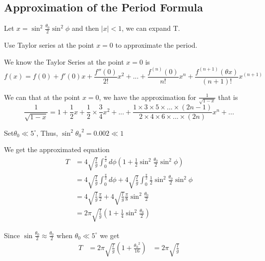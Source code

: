 \documentclass{article}
\begin{document}
\subsection{Approximation of the Period Formula}
\par Let $ x= \sin^2 \frac{\theta_0}{2} \sin^2 \phi $ and then $|x| < 1$, we can expand T.\\
\par  Use Taylor series at the point $x=0$ to approximate the period.\\
	\par We know the Taylor Series at the point $x=0$ is 
\begin{equation*}
 f(x) = f(0)+f'(0)x+\frac{f''(0)}{2!}x^2 +...+\frac{f^{(n)}(0)}{n!}x^n + \frac{f^{(n+1)}(\theta x)}{(n+1)!}x^ {(n+1)}
\end{equation*}
	\par We can that at the point $x=0$, we have the approximation for $ \frac{1}{\sqrt{1-x}} $ that is 
\begin{equation*}
 \frac{1}{\sqrt{1-x}} = 1+\frac{1}{2}x +\frac{1}{2} \times \frac{3}{4}x^2 +... + \frac{1\times 3 \times 5 \times ... \times (2n-1)}{2 \times 4 \times 6 \times ... \times (2n)} x^n +...
\end{equation*}
	\par  Set$  \theta_0 \ll 5^\circ $, Thus, $\sin^2 {\theta_0}^{2} = 0.002 \ll 1$ \\ 
	\par We get the approximated equation 
\begin{equation*}
 \begin{aligned}
 T & =  4\sqrt{\frac{l}{g}} \int_0^{\frac{\pi}{2}} d\phi (1+\frac{1}{2}\sin^2 \frac{\theta_0}{2} \sin^2 \phi) \\
    & =   4\sqrt{\frac{l}{g}} \int_0^{\frac{\pi}{2}} d\phi  + 4\sqrt{\frac{l}{g}} \int_0^{\frac{\pi}{2}} \frac{1}{2}\sin^2 \frac{\theta_0}{2} \sin^2 \phi \\
    & =  4\sqrt{\frac{l}{g}} \frac{\pi}{2} + 4\sqrt{\frac{l}{g}} \frac{\pi}{8} \sin^2 \frac{\theta_0}{2} \\
    & = 2\pi \sqrt{\frac{l}{g}} (1 + \frac{1}{4}\sin^2 \frac{\theta_0}{2} )
 \end{aligned}
\end{equation*}
	\par Since $\sin \frac{\theta_0}{2} \approx  \frac{\theta_0}{2}$ when $  \theta_0 \ll 5^\circ $ we get 
\begin{equation*}
 \begin{aligned}
 T & =   2\pi \sqrt{\frac{l}{g}} (1+\frac{{\theta_0} ^2}{16})
    & =  2\pi \sqrt{\frac{l}{g}}
  \end{aligned}
\end{equation*}
\end{document}
